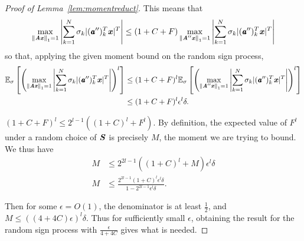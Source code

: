 \begin{proof}[Proof of Lemma~\ref{lem:momentreduct}]
This means that
\begin{equation*}
\max_{\left\| \boldsymbol{\mathit{A}} \boldsymbol{\mathit{x}} \right\|_1 = 1} \left | \sum_{k=1}^N \sigma_k |(\pmb{\mathit{a}}'')_k^T \boldsymbol{\mathit{x}}|^T \right |
\leq (1+C+F) \max_{\left\| \boldsymbol{\mathit{A}}'' \boldsymbol{\mathit{x}} \right\|_1 = 1} \left | \sum_{k=1}^N \sigma_k |(\pmb{\mathit{a}}'')_k^T \boldsymbol{\mathit{x}}|^T \right |
\end{equation*}
so that, applying the given moment bound on the random sign process,
\begin{align*}
{\mathbb{E}}_{\sigma}\left[ \left ( \max_{\left\| \boldsymbol{\mathit{A}} \boldsymbol{\mathit{x}} \right\|_1 = 1} \left | \sum_{k=1}^N \sigma_k |(\pmb{\mathit{a}}'')_k^T \boldsymbol{\mathit{x}}|^T \right | \right )^l \right] &\leq (1+C+F)^l {\mathbb{E}}_{\sigma}\left[ \left ( \max_{\left\| \boldsymbol{\mathit{A}}'' \boldsymbol{\mathit{x}} \right\|_1 = 1} \left | \sum_{k=1}^N \sigma_k |(\pmb{\mathit{a}}'')_k^T \boldsymbol{\mathit{x}}|^T \right | \right )^l \right] \\
&\leq (1+C+F)^l \epsilon^l \delta.
\end{align*}

$(1+C+F)^l \leq 2^{l-1} ((1+C)^l + F^l)$.  By definition, the expected value of $F^l$ under a random choice of $\boldsymbol{\mathit{S}}$ is precisely $M$, the moment we are trying to bound.  We thus have
\begin{align*}
M &\leq 2^{2l-1} ((1+C)^l + M) \epsilon^l \delta \\
M &\leq \frac{2^{2l-1} (1+C)^l \epsilon^l \delta}{1 - 2^{2l-1} \epsilon^l \delta}.
\end{align*}

Then for some $\epsilon = O(1)$, the denominator is at least $\frac{1}{2}$, and $M \leq ((4+4C) \epsilon)^l \delta$.  Thus for sufficiently small $\epsilon$, obtaining the result for the random sign process with $\frac{\epsilon}{4+4C}$ gives what is needed.
\end{proof}
